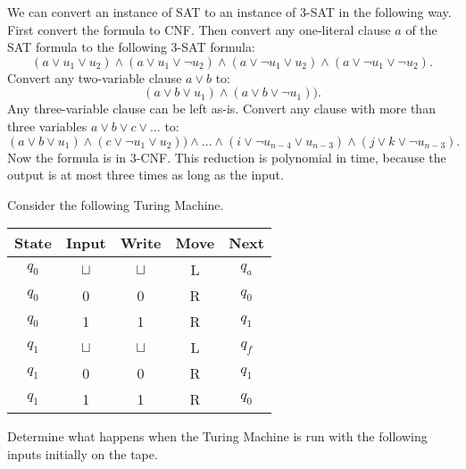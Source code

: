 \documentclass[a4paper, 12pt]{exam}
\begin{document}
\begin{questions}
\begin{solution}
    We can convert an instance of SAT to an instance of 3-SAT in the following way.
    First convert the formula to CNF.
    Then convert any one-literal clause \( a \) of the SAT formula to the following 3-SAT formula:
      \[ (a \lor u_1 \lor u_2) \land (a \lor u_1 \lor \neg u_2) \land (a \lor \neg u_1 \lor u_2) \land (a \lor \neg u_1 \lor \neg u_2). \]
    Convert any two-variable clause \( a \lor b \) to:
      \[ (a \lor b \lor u_1) \land (a \lor b \lor \neg u_1)). \]
    Any three-variable clause can be left as-is.
    Convert any clause with more than three variables \( a \lor b \lor c \lor \ldots \) to:
      \[ (a \lor b \lor u_1) \land (c \lor \neg u_1 \lor u_2)) \land \ldots \land (i \lor \neg u_{n-4} \lor u_{n-3}) \land (j \lor k \lor \neg u_{n-3}). \]
    Now the formula is in 3-CNF.
    This reduction is polynomial in time, because the output is at most three times as long as the input.
  \end{solution}


\question
  Consider the following Turing Machine.
  \begin{table}[H]
    \centering
    \begin{tabular}{ccccc}
      \toprule
          State & Input & Write & Move & Next \\
      \midrule
          \( q_0 \) & \( \sqcup \) & \( \sqcup \) & L & \( q_a \) \\
          \( q_0 \) & 0 & 0 & R & \( q_0 \) \\
          \( q_0 \) & 1 & 1 & R & \( q_1 \) \\
      \midrule
          \( q_1 \) & \( \sqcup \) & \( \sqcup \) & L & \( q_f \) \\
          \( q_1 \) & 0 & 0 & R & \( q_1 \) \\
          \( q_1 \) & 1 & 1 & R & \( q_0 \) \\
      \bottomrule
      \hline
    \end{tabular}
  \end{table}
  Determine what happens when the Turing Machine is run with the following inputs initially on the tape.
\end{questions}
\end{document}
